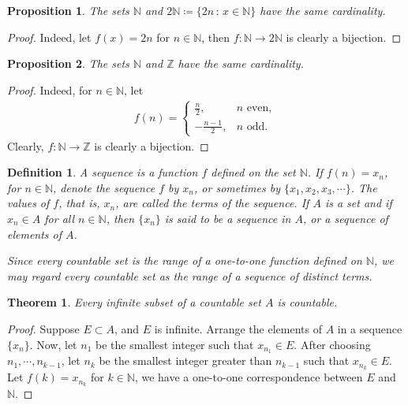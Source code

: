 \documentclass[10pt]{book}
\newtheorem{definition}{Definition}[chapter]
\newtheorem{theorem}{Theorem}[chapter]
\newtheorem{proposition}{Proposition}[chapter]
\theoremstyle{definition}
\numberwithin{equation}{chapter}
\begin{document}
\medskip

\begin{proposition}
The sets $\mathbb{N}$ and $2\mathbb{N} \coloneqq \{2n \,:\, x \in \mathbb{N}\}$ have the same cardinality.
\end{proposition}
\begin{proof}
Indeed, let $f(x) = 2n$ for $n \in \mathbb{N}$, then $f: \mathbb{N} \to 2\mathbb{N}$ is clearly a bijection.
\end{proof}

\medskip

\begin{proposition}
The sets $\mathbb{N}$ and $\mathbb{Z}$ have the same cardinality.
\end{proposition}
\begin{proof}
Indeed, for $n \in \mathbb{N}$, let
\begin{align*}
    f(n) = \begin{cases}
        \frac{n}{2}, & n \,\,\text{even}, \\
        - \frac{n-1}{2}, & n \,\,\text{odd}.
    \end{cases}
\end{align*}
Clearly, $f: \mathbb{N} \to \mathbb{Z}$ is clearly a bijection.
\end{proof}

\medskip

\begin{definition}
A sequence is a function $f$ defined on the set $\mathbb{N}$. If $f(n) = x_n$, for $n \in \mathbb{N}$, denote the sequence $f$ by ${x_n}$, or sometimes by $\{x_1, x_2, x_3, \cdots\}$. The values of $f$, that is, $x_n$, are called the terms of the sequence. If $A$ is a set and if $x_n \in A$ for all $n \in \mathbb{N}$, then $\{x_n\}$ is said to be a sequence in $A$, or a sequence of elements of $A$.

Since every countable set is the range of a one-to-one function defined on $\mathbb{N}$, we may regard every countable set as the range of a sequence of distinct terms.
\end{definition}

\medskip

\begin{theorem}\label{th_11}
Every infinite subset of a countable set $A$ is countable.
\end{theorem}
\begin{proof}
Suppose $E \subset A$, and $E$ is infinite. Arrange the elements of $A$ in a sequence $\{x_n\}$. Now, let $n_{1}$ be the smallest integer such that $x_{n_1} \in E$. After choosing $n_1, \cdots, n_{k-1}$, let $n_k$ be the smallest integer greater than $n_{k-1}$ such that $x_{n_k} \in E$. Let $f(k) = x_{n_k}$ for $k \in \mathbb{N}$, we have a one-to-one correspondence between $E$ and $\mathbb{N}$.
\end{proof}
\end{document}
